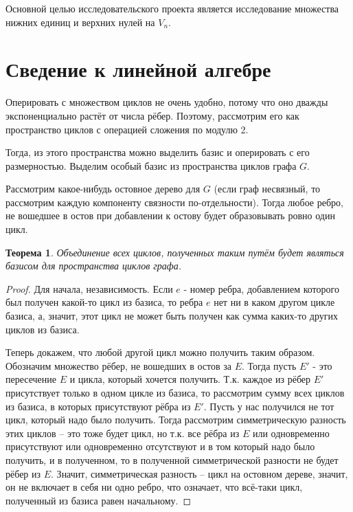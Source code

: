 \documentclass[a4paper]{article}
\newtheorem{theorem}{Теорема}[section]
\theoremstyle{definition}
\begin{document}
Основной целью исследовательского проекта является исследование множества нижних единиц и верхних нулей на $V_n$.




\newpage
\section{Сведение к линейной алгебре}

Оперировать с множеством циклов не очень удобно, потому что оно дважды экспоненциально растёт от числа рёбер. Поэтому, рассмотрим его как пространство циклов с операцией сложения по модулю 2.

Тогда, из этого пространства можно выделить базис и оперировать с его размерностью. Выделим особый базис из пространства циклов графа $G$.

Рассмотрим какое-нибудь остовное дерево для $G$ (если граф несвязный, то рассмотрим каждую компоненту связности по-отдельности). Тогда любое ребро, не вошедшее в остов при добавлении к остову будет образовывать ровно один цикл.

\begin{theorem} \label{t2}
	Объединение всех циклов, полученных таким путём будет являться базисом для пространства циклов графа.
\end{theorem}
\begin{proof}
	Для начала, независимость. Если $e$ - номер ребра, добавлением которого был получен какой-то цикл из базиса, то ребра $e$ нет ни в каком другом цикле базиса, а, значит, этот цикл не может быть получен как сумма каких-то других циклов из базиса.
	
	Теперь докажем, что любой другой цикл можно получить таким образом. Обозначим множество рёбер, не вошедших в остов за $E$. Тогда пусть $E'$ - это пересечение $E$ и цикла, который хочется получить. Т.к. каждое из рёбер $E'$ присутствует только в одном цикле из базиса, то рассмотрим сумму всех циклов из базиса, в которых присутствуют рёбра из $E'$. Пусть у нас получился не тот цикл, который надо было получить. Тогда рассмотрим симметрическую разность этих циклов -- это тоже будет цикл, но т.к. все рёбра из $E$ или одновременно присутствуют или одновременно отсутствуют и в том который надо было получить, и в полученном, то в полученной симметрической разности не будет рёбер из $E$. Значит, симметрическая разность -- цикл на остовном дереве, значит, он не включает в себя ни одно ребро, что означает, что всё-таки цикл, полученный из базиса равен начальному.
\end{proof}
\end{document}
